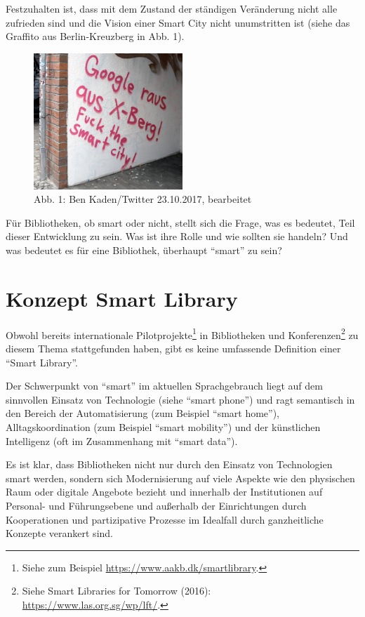 \documentclass[a4paper,
fontsize=11pt,
oneside,
numbers=noperiodatend,
parskip=half-,
bibliography=totoc,
final
]{scrartcl}
\begin{document}
Festzuhalten ist, dass mit dem Zustand der ständigen Veränderung nicht
alle zufrieden sind und die Vision einer Smart City nicht unumstritten
ist (siehe das Graffito aus Berlin-Kreuzberg in Abb. 1).

\begin{figure}
\centering
\includegraphics[width=0.5\textwidth]{img/Fig.3_Fuck_Smart_City.png}
\caption{Abb. 1: Ben Kaden/Twitter 23.10.2017, bearbeitet}
\end{figure}

Für Bibliotheken, ob smart oder nicht, stellt sich die Frage, was es
bedeutet, Teil dieser Entwicklung zu sein. Was ist ihre Rolle und wie
sollten sie handeln? Und was bedeutet es für eine Bibliothek, überhaupt
\enquote{smart} zu sein?

\hypertarget{konzept-smart-library}{%
\section{Konzept Smart Library}\label{konzept-smart-library}}

Obwohl bereits internationale Pilotprojekte\footnote{Siehe zum Beispiel
  \url{https://www.aakb.dk/smartlibrary}.} in Bibliotheken und
Konferenzen\footnote{Siehe Smart Libraries for Tomorrow (2016):
  \url{https://www.las.org.sg/wp/lft/}.} zu diesem Thema stattgefunden
haben, gibt es keine umfassende Definition einer \enquote{Smart
Library}.

Der Schwerpunkt von \enquote{smart} im aktuellen Sprachgebrauch liegt
auf dem sinnvollen Einsatz von Technologie (siehe \enquote{smart phone})
und ragt semantisch in den Bereich der Automatisierung (zum Beispiel
\enquote{smart home}), Alltagskoordination (zum Beispiel \enquote{smart
mobility}) und der künstlichen Intelligenz (oft im Zusammenhang mit
\enquote{smart data}).

Es ist klar, dass Bibliotheken nicht nur durch den Einsatz von
Technologien smart werden, sondern sich Modernisierung auf viele Aspekte
wie den physischen Raum oder digitale Angebote bezieht und innerhalb der
Institutionen auf Personal- und Führungsebene und außerhalb der
Einrichtungen durch Kooperationen und partizipative Prozesse im
Idealfall durch ganzheitliche Konzepte verankert sind.
\end{document}
